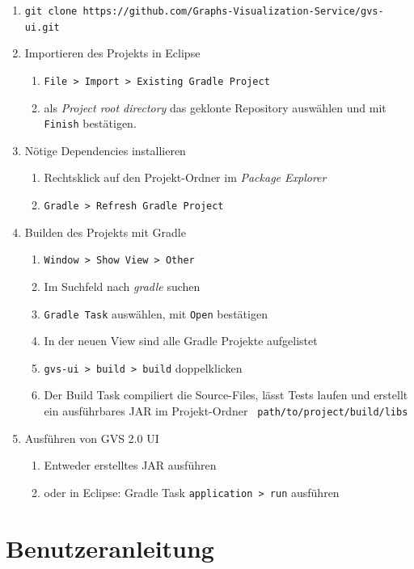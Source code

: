 \documentclass[11pt,a4paper,english,oneside]{book}
\numberwithin{equation}{chapter}
\begin{document}
	\begin{enumerate}
		\item \lstinline{git clone https://github.com/Graphs-Visualization-Service/gvs-ui.git}
		\item Importieren des Projekts in Eclipse
		\begin{enumerate}
			\item \lstinline{File > Import > Existing Gradle Project}
			\item als \textit{Project root directory} das geklonte Repository auswählen und mit \lstinline{Finish} bestätigen.
		\end{enumerate}
		\item Nötige Dependencies installieren
		\begin{enumerate}
			\item Rechtsklick auf den Projekt-Ordner im \textit{Package Explorer}
			\item \lstinline{Gradle > Refresh Gradle Project}
		\end{enumerate}
		\item Builden des Projekts mit Gradle
		\begin{enumerate}
			\item \lstinline{Window > Show View > Other}
			\item Im Suchfeld nach \textit{gradle} suchen
			\item \lstinline{Gradle Task} auswählen, mit \lstinline{Open} bestätigen
			\item In der neuen View sind alle Gradle Projekte aufgelistet
			\item \lstinline{gvs-ui > build > build} doppelklicken
			\item Der Build Task compiliert die Source-Files, lässt Tests laufen und erstellt ein ausführbares JAR im Projekt-Ordner \lstinline{ path/to/project/build/libs}
		\end{enumerate}
		\item Ausführen von GVS 2.0 UI
		\begin{enumerate}
			\item Entweder erstelltes JAR ausführen
			\item oder in Eclipse: Gradle Task \lstinline{application > run} ausführen
		\end{enumerate}
	\end{enumerate}
	
	
	\chapter{Benutzeranleitung}
\end{document}
